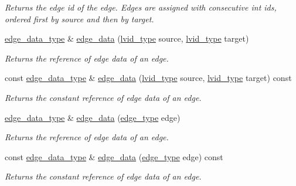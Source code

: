 \begin{DoxyCompactItemize}
\begin{DoxyCompactList}\small\item\em Returns the edge id of the edge. Edges are assigned with consecutive int ids, ordered first by source and then by target. \end{DoxyCompactList}\item 
\hyperlink{classsaedb_1_1graph__storage_a0b1aa3431f497cae28ac1de81c5004c2}{edge\-\_\-data\-\_\-type} \& \hyperlink{classsaedb_1_1graph__storage_a077167962d309c3e27975d4dcb894f8b}{edge\-\_\-data} (\hyperlink{classsaedb_1_1graph__storage_a147a907accd64bb1f803a423d04dd04b}{lvid\-\_\-type} source, \hyperlink{classsaedb_1_1graph__storage_a147a907accd64bb1f803a423d04dd04b}{lvid\-\_\-type} target)
\begin{DoxyCompactList}\small\item\em Returns the reference of edge data of an edge. \end{DoxyCompactList}\item 
const \hyperlink{classsaedb_1_1graph__storage_a0b1aa3431f497cae28ac1de81c5004c2}{edge\-\_\-data\-\_\-type} \& \hyperlink{classsaedb_1_1graph__storage_a3dccdcb483f4e30477949b151da283eb}{edge\-\_\-data} (\hyperlink{classsaedb_1_1graph__storage_a147a907accd64bb1f803a423d04dd04b}{lvid\-\_\-type} source, \hyperlink{classsaedb_1_1graph__storage_a147a907accd64bb1f803a423d04dd04b}{lvid\-\_\-type} target) const 
\begin{DoxyCompactList}\small\item\em Returns the constant reference of edge data of an edge. \end{DoxyCompactList}\item 
\hyperlink{classsaedb_1_1graph__storage_a0b1aa3431f497cae28ac1de81c5004c2}{edge\-\_\-data\-\_\-type} \& \hyperlink{classsaedb_1_1graph__storage_a3f50489c5a4826eb0f7e0371001364ed}{edge\-\_\-data} (\hyperlink{classsaedb_1_1graph__storage_1_1edge__type}{edge\-\_\-type} edge)
\begin{DoxyCompactList}\small\item\em Returns the reference of edge data of an edge. \end{DoxyCompactList}\item 
const \hyperlink{classsaedb_1_1graph__storage_a0b1aa3431f497cae28ac1de81c5004c2}{edge\-\_\-data\-\_\-type} \& \hyperlink{classsaedb_1_1graph__storage_aa9daef7e3f17c6e0c1d6538fdad2f813}{edge\-\_\-data} (\hyperlink{classsaedb_1_1graph__storage_1_1edge__type}{edge\-\_\-type} edge) const 
\begin{DoxyCompactList}\small\item\em Returns the constant reference of edge data of an edge. \end{DoxyCompactList}\item 

\end{DoxyCompactItemize}
